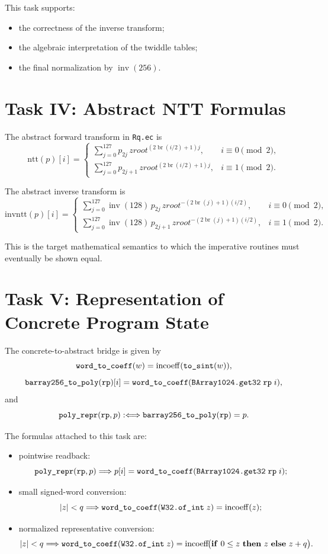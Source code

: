 \documentclass[11pt]{article}
\newcommand{\code}[1]{\text{\texttt{#1}}}
\begin{document}
This task supports:
\begin{itemize}
\item the correctness of the inverse transform;
\item the algebraic interpretation of the twiddle tables;
\item the final normalization by \(\operatorname{inv}(256)\).
\end{itemize}

\section{Task IV: Abstract NTT Formulas}

The abstract forward transform in \texttt{Rq.ec} is
\[
\mathrm{ntt}(p)[i]
=
\begin{cases}
\displaystyle \sum_{j=0}^{127} p_{2j}\, zroot^{(2\operatorname{br}(i/2)+1)j},
& i \equiv 0 \pmod 2,\\[1.25em]
\displaystyle \sum_{j=0}^{127} p_{2j+1}\, zroot^{(2\operatorname{br}(i/2)+1)j},
& i \equiv 1 \pmod 2.
\end{cases}
\]

The abstract inverse transform is
\[
\mathrm{invntt}(p)[i]
=
\begin{cases}
\displaystyle \sum_{j=0}^{127} \operatorname{inv}(128)\, p_{2j}\,
zroot^{-(2\operatorname{br}(j)+1)(i/2)},
& i \equiv 0 \pmod 2,\\[1.25em]
\displaystyle \sum_{j=0}^{127} \operatorname{inv}(128)\, p_{2j+1}\,
zroot^{-(2\operatorname{br}(j)+1)(i/2)},
& i \equiv 1 \pmod 2.
\end{cases}
\]

This is the target mathematical semantics to which the imperative routines
must eventually be shown equal.

\section{Task V: Representation of Concrete Program State}

The concrete-to-abstract bridge is given by
\[
\code{word\_to\_coeff}(w) = \operatorname{incoeff}(\code{to\_sint}(w)),
\]
\[
\code{barray256\_to\_poly}(\texttt{rp})[i]
=
\code{word\_to\_coeff}(\texttt{BArray1024.get32}\; \texttt{rp}\; i),
\]
and
\[
\code{poly\_repr}(\texttt{rp},p)
:\Longleftrightarrow
\code{barray256\_to\_poly}(\texttt{rp}) = p.
\]

The formulas attached to this task are:
\begin{itemize}
\item pointwise readback:
  \[
  \code{poly\_repr}(\texttt{rp},p) \Longrightarrow
  p[i] = \code{word\_to\_coeff}(\texttt{BArray1024.get32}\; \texttt{rp}\; i);
  \]
\item small signed-word conversion:
  \[
  |z| < q \Longrightarrow
  \code{word\_to\_coeff}(\texttt{W32.of\_int}\; z) = \operatorname{incoeff}(z);
  \]
\item normalized representative conversion:
  \[
  |z| < q \Longrightarrow
  \code{word\_to\_coeff}(\texttt{W32.of\_int}\; z)
  =
  \operatorname{incoeff}\!\bigl(\mathbf{if}\ 0 \le z\ \mathbf{then}\ z\ \mathbf{else}\ z+q\bigr).
  \]
\end{itemize}
\end{document}
